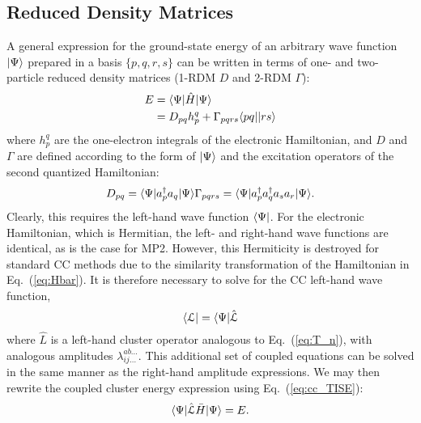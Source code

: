 \subsection{Reduced Density Matrices} \label{ss:rdm} A general expression
for the ground-state energy of an arbitrary wave function $| \Psi \rangle$
prepared in a basis $\{p,q,r,s\}$ can be written in terms of one- and
two-particle reduced density matrices (1-RDM $D$ and 2-RDM $\Gamma$):
\cite{Harris1992,Trucks1988}
\begin{equation} \label{eq:pdm_e}
    \begin{aligned} E & = \langle\Psi |\hat{H}| \Psi \rangle \\
      & = D_{pq}h_{p}^{q} + \Gamma_{pqrs}\langle pq || rs \rangle
    \end{aligned}
\end{equation} where $h_{p}^{q}$ are the one-electron integrals of the
electronic Hamiltonian, and $D$ and $\Gamma$ are defined according to the
form of $| \Psi \rangle$ and the excitation operators of the second quantized
Hamiltonian: \begin{subequations} \begin{equation} \label{eq:opdm}
    D_{pq} = \bra{\Psi}a_p^{\dagger}a_q\ket{\Psi}
\end{equation} \begin{equation} \label{eq:tpdm}
    \Gamma_{pqrs} = \bra{\Psi}a_p^{\dagger}a_q^{\dagger}a_sa_r\ket{\Psi}.
\end{equation} \end{subequations} 
Clearly, this requires the
left-hand wave function $\langle\Psi |$. For the electronic Hamiltonian,
which is Hermitian, the left- and right-hand wave functions are identical,
as is the case for MP2. However, this Hermiticity is destroyed for standard
CC methods due to the similarity transformation of the Hamiltonian in
Eq.~(\ref{eq:Hbar}).\cite{Crawford2000} It is therefore necessary to solve for the CC left-hand
wave function, \begin{equation} \label{eq:cc_lwfn}
    \langle\mathcal{L} | = \langle\Psi |\hat{\mathcal{L}}
\end{equation} where $\hat{L}$ is a left-hand cluster
operator analogous to Eq.~(\ref{eq:T_n}), with analogous amplitudes
$\lambda_{ij\ldots}^{ab\ldots}$. This additional set of coupled
equations can be solved in the same manner as the right-hand amplitude
expressions. We may then rewrite the coupled cluster energy expression
using Eq.~(\ref{eq:cc_TISE}): \begin{equation} \label{eq:cc_energy_total}
    \langle\Psi |\hat{\mathcal{L}}\bar{H}| \Psi \rangle = E.
\end{equation}

